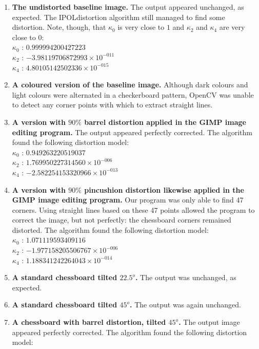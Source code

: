 \begin{enumerate}
  \item \textbf{The undistorted baseline image.} The output appeared unchanged, as expected. The IPOLdistortion algorithm still managed to find some distortion. Note, though, that $\kappa_{0}$ is very close to $1$ and $\kappa_{2}$ and $\kappa_{4}$ are very close to $0$:\\
   $ \kappa_{0}$ : $0.999994200427223$\\
   $ \kappa_{2}$ : $-3.98119706872993 \times 10^{-011}$\\
   $ \kappa_{4}$ : $4.80105142502336 \times 10^{-015}$
  \item \textbf{A coloured version of the baseline image.} Although dark colours and light colours were alternated in a checkerboard pattern, OpenCV was unable to detect any corner points with which to extract straight lines.
  \item \textbf{A version with $90\%$ barrel distortion applied in the GIMP image editing program.} The output appeared perfectly corrected. The algorithm found the following distortion model:\\
   $ \kappa_{0}$ : $0.949263220519037$\\
   $ \kappa_{2}$ : $1.769950227314560 \times 10^{-006}$\\
   $ \kappa_{4}$ : $-2.582254153320966 \times 10^{-013}$
  \item \textbf{A version with $90\%$ pincushion distortion likewise applied in the GIMP image editing program.} Our program was only able to find 47 corners. Using straight lines based on these 47 points allowed the program to correct the image, but not perfectly: the chessboard corners remained distorted. The algorithm found the following distortion model:\\
   $ \kappa_{0}$ : $1.071119593409116$\\
   $ \kappa_{2}$ : $-1.977158205506767 \times 10^{-006}$\\
   $ \kappa_{4}$ : $1.188341242264043 \times 10^{-014}$
  \item \textbf{A standard chessboard tilted $22.5^o$.} The output was unchanged, as expected.
  \item \textbf{A standard chessboard tilted $45^o$.} The output was again unchanged.
  \item \textbf{A chessboard with barrel distortion, tilted $45^o$.} The output image appeared perfectly corrected. The algorithm found the following distortion model:\\

\end{enumerate}
